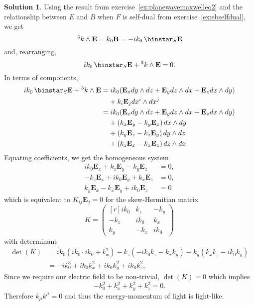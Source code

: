 \documentclass[11pt, a4paper]{report}
\theoremstyle{definition}
\newtheorem{solution}{Solution}[part]
\newenvironment{sol}{\begin{solution}}{\end{solution}\pagebreak[3]}
\newcommand*{\pheq}{\ensuremath\mathrel{\phantom{=}}\negmedspace{}}
\newcommand*{\op}[1]{\ensuremath\mathop{}\mathopen{}#1}
\renewcommand*{\d}{\op{d}}
\renewcommand*{\star}{\op{\binstar}\mathord{}}
\begin{document}
\begin{sol}


Using the result from exercise~\ref{ex:planewavemaxwelleq2} and the relationship between $E$ and $B$ when $F$ is self-dual from exercise~\ref{ex:ebselfdual}, we get
\[
    ^3 k \wedge \mathbf{E} = k_0 \mathbf{B} = -ik_0 \star_S \mathbf{E}
\]
and, rearranging,
\[
    ik_0 \star_S \mathbf{E} + {}^3 k \wedge \mathbf{E} = 0.
\]
In terms of components,
\begin{align*}
    ik_0 \star_S \mathbf{E} + {}^3 k \wedge \mathbf{E}
        &= ik_0 (\mathbf{E}_x dy \wedge dz
                 + \mathbf{E}_y dz \wedge dx
                 + \mathbf{E}_z dx \wedge dy) \\
        &\pheq + k_i \mathbf{E}_j dx^i \wedge dx^j \\
        &= ik_0 (\mathbf{E}_x dy \wedge dz
                 + \mathbf{E}_y dz \wedge dx
                 + \mathbf{E}_z dx \wedge dy) \\
        &\pheq + (k_x \mathbf{E}_y - k_y \mathbf{E}_x) \d x \wedge dy \\
        &\pheq + (k_y \mathbf{E}_z - k_z \mathbf{E}_y) \d y \wedge dz \\
        &\pheq + (k_z \mathbf{E}_x - k_x \mathbf{E}_z) \d z \wedge dx.
\end{align*}
Equating coefficients, we get the homogeneous system
\begin{align*}
    ik_0 \mathbf{E}_x + k_z \mathbf{E}_y - k_y \mathbf{E}_z &= 0, \\
    -k_z \mathbf{E}_x + ik_0 \mathbf{E}_y + k_x \mathbf{E}_z &= 0, \\
    k_y \mathbf{E}_x - k_x \mathbf{E}_y + ik_0 \mathbf{E}_z &= 0
\end{align*}
which is equivalent to $K_{ij} \mathbf{E}_j = 0$ for the skew-Hermitian matrix
\[
    K = \begin{pmatrix*}[r]
            ik_0 & k_z  & -k_y \\
            -k_z & ik_0 & k_x \\
            k_y  & -k_x & ik_0
        \end{pmatrix*}
\]
with determinant
\begin{align*}
    \det(K) &= ik_0 (ik_0 \cdot ik_0 + k_x^2) - k_z(-ik_0 k_z - k_x k_y) - k_y (k_x k_z - ik_0 k_y) \\
            &= -i k_0^3 + ik_0 k_x^2 + ik_0 k_y^2 + ik_0 k_z^2.
\end{align*}
Since we require our electric field to be non-trivial, $\det(K) = 0$ which implies
\[
    -k_0^2 + k_x^2 + k_y^2 + k_z^2 = 0.
\]
Therefore $k_\mu k^\mu = 0$ and thus the energy-momentum of light is light-like.

\end{sol}
\end{document}
